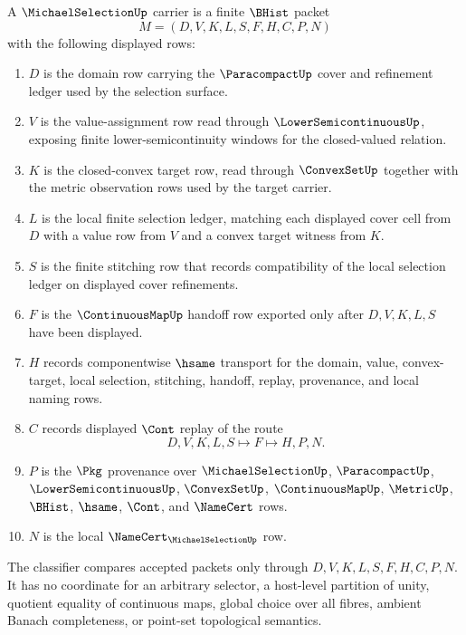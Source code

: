 \begin{definition}
\label{def:michael-selection-carrier}
A $\MichaelSelectionUp$ carrier is a finite $\BHist$ packet
$$
M=(D,V,K,L,S,F,H,C,P,N)
$$
with the following displayed rows:
\begin{enumerate}
\item $D$ is the domain row carrying the $\ParacompactUp$ cover and refinement ledger used by the selection surface.
\item $V$ is the value-assignment row read through $\LowerSemicontinuousUp$, exposing finite lower-semicontinuity windows for the closed-valued relation.
\item $K$ is the closed-convex target row, read through $\ConvexSetUp$ together with the metric observation rows used by the target carrier.
\item $L$ is the local finite selection ledger, matching each displayed cover cell from $D$ with a value row from $V$ and a convex target witness from $K$.
\item $S$ is the finite stitching row that records compatibility of the local selection ledger on displayed cover refinements.
\item $F$ is the $\ContinuousMapUp$ handoff row exported only after $D,V,K,L,S$ have been displayed.
\item $H$ records componentwise $\hsame$ transport for the domain, value, convex-target, local selection, stitching, handoff, replay, provenance, and local naming rows.
\item $C$ records displayed $\Cont$ replay of the route
$$
D,V,K,L,S \longmapsto F \longmapsto H,P,N .
$$
\item $P$ is the $\Pkg$ provenance over $\MichaelSelectionUp$, $\ParacompactUp$, $\LowerSemicontinuousUp$, $\ConvexSetUp$, $\ContinuousMapUp$, $\MetricUp$, $\BHist$, $\hsame$, $\Cont$, and $\NameCert$ rows.
\item $N$ is the local $\NameCert_{\MichaelSelectionUp}$ row.
\end{enumerate}
The classifier compares accepted packets only through $D,V,K,L,S,F,H,C,P,N$. It has no coordinate for an arbitrary selector, a host-level partition of unity, quotient equality of continuous maps, global choice over all fibres, ambient Banach completeness, or point-set topological semantics.
\end{definition}

